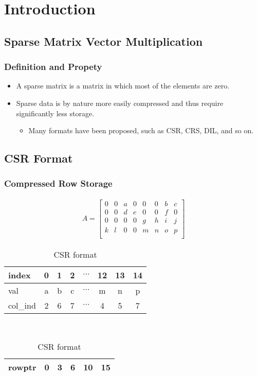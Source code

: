 \section{Introduction}

\subsection{Sparse Matrix Vector Multiplication}
\begin{frame}
    \frametitle{Definition and Propety}
	\begin{itemize}
		\item A sparse matrix is a matrix in which most of the elements 
			are zero.
		\item Sparse data is by nature more easily compressed and thus 
			require significantly less storage.
			\begin{itemize}
				\item Many formats have been proposed, such as CSR, 
					CRS, DIL, and so on.
			\end{itemize}
	\end{itemize}
\end{frame}

\subsection{CSR Format}
\begin{frame}[fragile]
	\frametitle{Compressed Row Storage}
	\begin{align*}
		A = \begin{bmatrix}
			0 & 0 & a & 0 & 0 & 0 & b & c \\
			0 & 0 & d & e & 0 & 0 & f & 0 \\
			0 & 0 & 0 & 0 & g & h & i & j \\
			k & l & 0 & 0 & m & n & o & p \\
		\end{bmatrix}
	\end{align*}
	\begin{table}[]
		\centering
		\caption{CSR format}
		\label{my-label}
		\begin{tabular}{l | c | c | c | c | c | c | c}
			\hline
		index & 0 & 1 & 2 & $\cdots$ & 12 & 13 & 14 \\ \hline
		val      & a & b & c & $\cdots$ & m & n & p  \\ \hline
		col\_ind & 2 & 6 & 7 & $\cdots$ & 4 & 5 & 7 \\ \hline
		\end{tabular}
		\\
		\begin{tabular}{l | c | c | c | c | c}
			\hline
		rowptr      & 0 & 3 & 6 & 10 & 15 \\ \hline
		\end{tabular}
	\end{table}
\end{frame}

